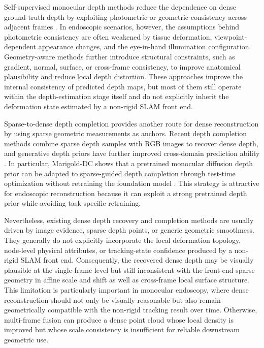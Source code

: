 \documentclass[pdflatex,sn-mathphys-num]{sn-jnl}
\begin{document}
Self-supervised monocular depth methods reduce the dependence on dense ground-truth depth by exploiting photometric or geometric consistency across adjacent frames \cite{bib21,bib22}. In endoscopic scenarios, however, the assumptions behind photometric consistency are often weakened by tissue deformation, viewpoint-dependent appearance changes, and the eye-in-hand illumination configuration. Geometry-aware methods further introduce structural constraints, such as gradient, normal, surface, or cross-frame consistency, to improve anatomical plausibility and reduce local depth distortion. These approaches improve the internal consistency of predicted depth maps, but most of them still operate within the depth-estimation stage itself and do not explicitly inherit the deformation state estimated by a non-rigid SLAM front end.

Sparse-to-dense depth completion provides another route for dense reconstruction by using sparse geometric measurements as anchors. Recent depth completion methods combine sparse depth samples with RGB images to recover dense depth, and generative depth priors have further improved cross-domain prediction ability \cite{bib10,bib11,bib12,bib13,bib14,bib15,bib16,bib17,bib18,bib19,bib27,bib28,bib29,bib30,bib31,bib32,bib33}. In particular, Marigold-DC shows that a pretrained monocular diffusion depth prior can be adapted to sparse-guided depth completion through test-time optimization without retraining the foundation model \cite{bib20}. This strategy is attractive for endoscopic reconstruction because it can exploit a strong pretrained depth prior while avoiding task-specific retraining.

Nevertheless, existing dense depth recovery and completion methods are usually driven by image evidence, sparse depth points, or generic geometric smoothness. They generally do not explicitly incorporate the local deformation topology, node-level physical attributes, or tracking-state confidence produced by a non-rigid SLAM front end. Consequently, the recovered dense depth may be visually plausible at the single-frame level but still inconsistent with the front-end sparse geometry in affine scale and shift as well as cross-frame local surface structure. This limitation is particularly important in monocular endoscopy, where dense reconstruction should not only be visually reasonable but also remain geometrically compatible with the non-rigid tracking result over time. Otherwise, multi-frame fusion can produce a dense point cloud whose local density is improved but whose scale consistency is insufficient for reliable downstream geometric use.
\end{document}
